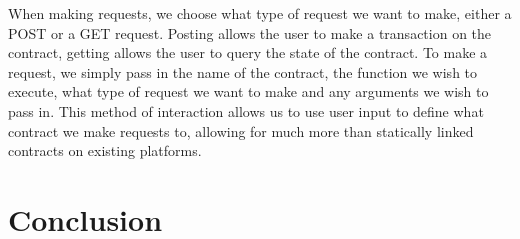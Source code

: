\documentclass[a4paper]{article}
\begin{document}
When making requests, we choose what type of request we want to make, either a POST or a GET request. Posting allows the user to make a transaction on the contract, getting allows the user to query the state of the contract. To make a request, we simply pass in the name of the contract, the function we wish to execute, what type of request we want to make and any arguments we wish to pass in. This method of interaction allows us to use user input to define what contract we make requests to, allowing for much more than statically linked contracts on existing platforms.

\section{Conclusion}
\end{document}
